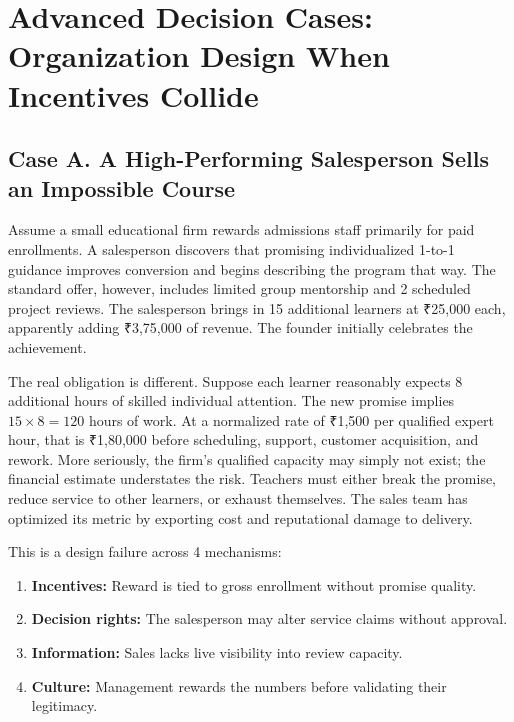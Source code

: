 \section*{Advanced Decision Cases: Organization Design When Incentives Collide}

\subsection*{Case A. A High-Performing Salesperson Sells an Impossible Course}

Assume a small educational firm rewards admissions staff primarily for paid enrollments. A salesperson discovers that promising individualized 1-to-1 guidance improves conversion and begins describing the program that way. The standard offer, however, includes limited group mentorship and 2 scheduled project reviews. The salesperson brings in 15 additional learners at ₹25,000 each, apparently adding ₹3,75,000 of revenue. The founder initially celebrates the achievement.

The real obligation is different. Suppose each learner reasonably expects 8 additional hours of skilled individual attention. The new promise implies $15 \times 8 = 120$ hours of work. At a normalized rate of ₹1,500 per qualified expert hour, that is ₹1,80,000 before scheduling, support, customer acquisition, and rework. More seriously, the firm's qualified capacity may simply not exist; the financial estimate understates the risk. Teachers must either break the promise, reduce service to other learners, or exhaust themselves. The sales team has optimized its metric by exporting cost and reputational damage to delivery.

This is a design failure across 4 mechanisms:
\begin{enumerate}
    \item \textbf{Incentives:} Reward is tied to gross enrollment without promise quality.
    \item \textbf{Decision rights:} The salesperson may alter service claims without approval.
    \item \textbf{Information:} Sales lacks live visibility into review capacity.
    \item \textbf{Culture:} Management rewards the numbers before validating their legitimacy.
\end{enumerate}

